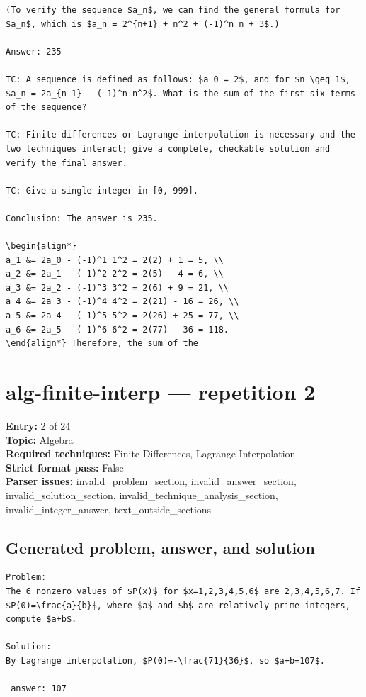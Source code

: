 \documentclass[11pt]{article}
\begin{document}
\begin{Verbatim}[breaklines=true,breakanywhere=true,fontsize=\small]
(To verify the sequence $a_n$, we can find the general formula for $a_n$, which is $a_n = 2^{n+1} + n^2 + (-1)^n n + 3$.)

Answer: 235

TC: A sequence is defined as follows: $a_0 = 2$, and for $n \geq 1$, $a_n = 2a_{n-1} - (-1)^n n^2$. What is the sum of the first six terms of the sequence?

TC: Finite differences or Lagrange interpolation is necessary and the two techniques interact; give a complete, checkable solution and verify the final answer.

TC: Give a single integer in [0, 999].

Conclusion: The answer is 235.

\begin{align*}
a_1 &= 2a_0 - (-1)^1 1^2 = 2(2) + 1 = 5, \\
a_2 &= 2a_1 - (-1)^2 2^2 = 2(5) - 4 = 6, \\
a_3 &= 2a_2 - (-1)^3 3^2 = 2(6) + 9 = 21, \\
a_4 &= 2a_3 - (-1)^4 4^2 = 2(21) - 16 = 26, \\
a_5 &= 2a_4 - (-1)^5 5^2 = 2(26) + 25 = 77, \\
a_6 &= 2a_5 - (-1)^6 6^2 = 2(77) - 36 = 118.
\end{align*} Therefore, the sum of the
\end{Verbatim}
\clearpage
\section{alg-finite-interp --- repetition 2}
{\color{metadata}
\textbf{Entry:} 2 of 24\\
\textbf{Topic:} Algebra\\
\textbf{Required techniques:} Finite Differences, Lagrange Interpolation\\
\textbf{Strict format pass:} False\\
\textbf{Parser issues:} invalid\_problem\_section, invalid\_answer\_section, invalid\_solution\_section, invalid\_technique\_analysis\_section, invalid\_integer\_answer, text\_outside\_sections
}

\subsection*{Generated problem, answer, and solution}
\begin{Verbatim}[breaklines=true,breakanywhere=true,fontsize=\small]
Problem:
The 6 nonzero values of $P(x)$ for $x=1,2,3,4,5,6$ are 2,3,4,5,6,7. If $P(0)=\frac{a}{b}$, where $a$ and $b$ are relatively prime integers, compute $a+b$.

Solution:
By Lagrange interpolation, $P(0)=-\frac{71}{36}$, so $a+b=107$.

 answer: 107
\end{Verbatim}
\clearpage
\end{document}

